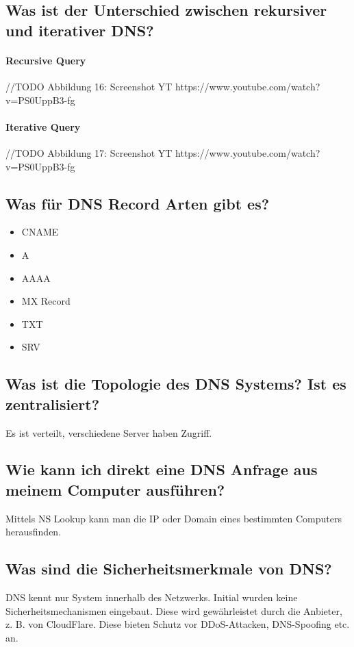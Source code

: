 \subsection*{Was ist der Unterschied zwischen rekursiver und iterativer DNS?}
\paragraph*{Recursive Query}
//TODO Abbildung 16: Screenshot YT https://www.youtube.com/watch?v=PS0UppB3-fg

\paragraph*{Iterative Query}
//TODO Abbildung 17: Screenshot YT https://www.youtube.com/watch?v=PS0UppB3-fg

\subsection*{Was für DNS Record Arten gibt es?}
\begin{itemize}
        \item CNAME
        \item A
        \item AAAA
        \item MX Record
        \item TXT
        \item SRV
\end{itemize}

\subsection*{Was ist die Topologie des DNS Systems? Ist es zentralisiert?}
Es ist verteilt, verschiedene Server haben Zugriff.

\subsection*{Wie kann ich direkt eine DNS Anfrage aus meinem Computer ausführen?}
Mittels NS Lookup kann man die IP oder Domain eines bestimmten Computers herausfinden.

\subsection*{Was sind die Sicherheitsmerkmale von DNS?}
DNS kennt nur System innerhalb des Netzwerks. Initial wurden keine Sicherheitsmechanismen eingebaut. Diese wird gewährleistet durch die Anbieter, z. B. von CloudFlare. Diese bieten Schutz vor DDoS-Attacken, DNS-Spoofing etc. an.

